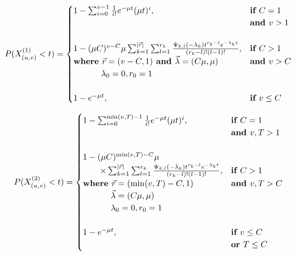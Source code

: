 \begin{equation}\label{eq:proportion_within_target_type_1_from_state}
    P(X_{(u,v)}^{(1)} < t) = 
    \begin{cases}
        1 - \sum_{i=0}^{v-1} \frac{1}{i!} e^{-\mu t} (\mu t)^i, 
            & \textbf{if } C = 1 \\
            & \textbf{and } v>1 \\
        & \\
        1 - (\mu C)^{v-C} \mu  
            \sum_{k=1}^{\mid \vec{r} \mid} \sum_{l=1}^{r_k}
            \frac{\Psi_{k,l}(-\lambda_k)t^{r_k - l} 
            e^{-\lambda_k t}}{(r_k - l)! (l - 1)!},
            & \textbf{if } C > 1 \\
        \textbf{where } \vec{r}=(v - C, 1) \textbf{ and } 
            \vec{\lambda}=(C \mu, \mu) & \textbf{and } v > C \\
            \hspace{1.15cm} \lambda_0 = 0, r_0 = 1 \\
        & \\
        1 - e^{-\mu t},  & \textbf{if } v \leq C
    \end{cases}
\end{equation}


\begin{equation}\label{eq:proportion_within_target_type_2_from_state}
    P(X_{(u,v)}^{(2)} < t) = 
    \begin{cases}
        1 - \sum_{i=0}^{\min(v,T)-1} \frac{1}{i!} e^{-\mu t} (\mu t)^i,  
            & \textbf{if } C = 1 \\ 
            & \textbf{and } v, T > 1 \\
            & \\
        1 - (\mu C) ^ {\min(v,T) - C} \mu  
            &  \\
        \qquad \times \sum_{k=1}^{\mid \vec{r} \mid} \sum_{l=1}^{r_k} 
        \frac{\Psi_{k,l}(-\lambda_k)t^{r_k - l} 
        e^{-\lambda_k t}}{(r_k - l)! (l - 1)!}, 
            & \textbf{if } C > 1 \\
        \textbf{where } \vec{r}=(\min(v, T) - C, 1) 
            & \textbf{and } v, T  > C\\
        \hspace{1.15cm} \vec{\lambda}=(C \mu, \mu) \\
        \hspace{1.15cm} \lambda_0 = 0, r_0 = 1 \\
            & \\
        1 - e^{-\mu t}, & \textbf{if } v \leq C \\ 
            & \textbf{or } T \leq C \\
    \end{cases}
\end{equation}

